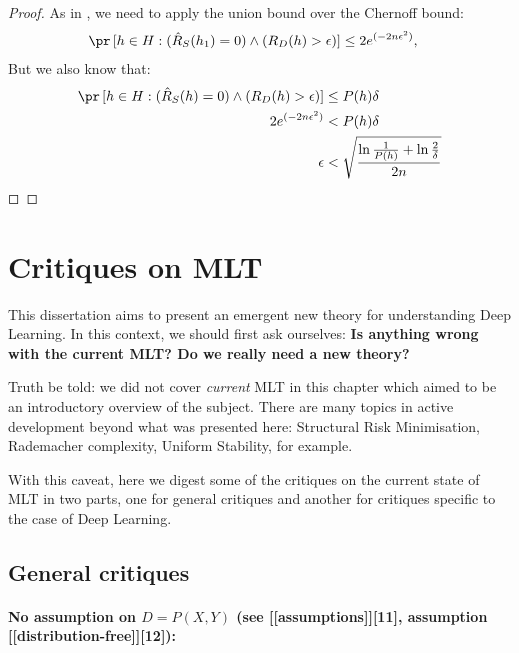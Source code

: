\documentclass[
  letterpaper,
  12pt,
  british]{tufte-book}
\let\oldparagraph\paragraph
\renewcommand{\paragraph}[1]{\oldparagraph{#1}\mbox{}}
\theoremstyle{plain}
\theoremstyle{definition}
\theoremstyle{plain}
\theoremstyle{remark}
\begin{document}
\begin{proof}

As in , we need to apply the union bound over the Chernoff bound:
\begin{align}
        \pr\,[h \in H: (\hat{R}_{S}(h_1)=0) \land (R_{D}(h)>\epsilon)] &\leq 2e^{(-2n\epsilon^2)},
    
\end{align} But we also know that: \begin{align}
        \pr\,[h \in H: (\hat{R}_{S}(h)=0) \land (R_{D}(h)>\epsilon)] &\leq P(h)\delta \\
        2e^{(-2n\epsilon^2)} &< P(h) \delta\\
        \epsilon &< \sqrt{\frac{\ln{\frac{1}{P(h)}}+ \ln{\frac{2}{\delta}}}{2n}} \nonumber
    
\end{align} ◻

\end{proof}

\hypertarget{sec-mlt_criticism}{%
\section{Critiques on MLT}\label{sec-mlt_criticism}}

This dissertation aims to present an emergent new theory for
understanding Deep Learning. In this context, we should first ask
ourselves: \textbf{Is anything wrong with the current {MLT}? Do we
really need a new theory?}

Truth be told: we did not cover \emph{current} {MLT} in this chapter
which aimed to be an introductory overview of the subject. There are
many topics in active development beyond what was presented here:
Structural Risk Minimisation, Rademacher complexity, Uniform Stability,
for example.

With this caveat, here we digest some of the critiques on the current
state of MLT in two parts, one for general critiques and another for
critiques specific to the case of Deep Learning.

\hypertarget{sec-general_critiques}{%
\subsection{General critiques}\label{sec-general_critiques}}

\hypertarget{no-assumption-on-dpmathitxmathity-see-assumptions11-assumption-distribution-free12}{%
\paragraph{\texorpdfstring{No assumption on
\(D=P(\mathit{X},\mathit{Y})\) (see {[}{[}assumptions{]}{]}{[}11{]},
assumption
{[}{[}distribution-free{]}{]}{[}12{]}):}{No assumption on D=P(\textbackslash mathit\{X\},\textbackslash mathit\{Y\}) (see {[}{[}assumptions{]}{]}{[}11{]}, assumption {[}{[}distribution-free{]}{]}{[}12{]}):}}\label{no-assumption-on-dpmathitxmathity-see-assumptions11-assumption-distribution-free12}}
\end{document}
